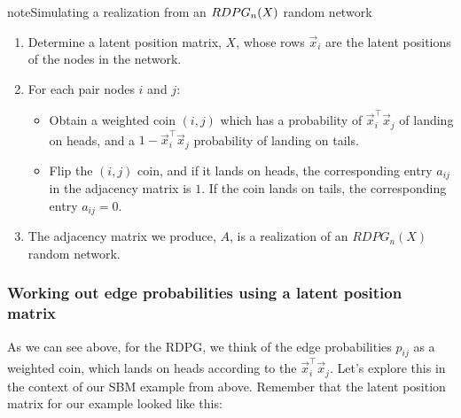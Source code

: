 \documentclass[letterpaper,10pt,english]{jupyterBook}
\begin{document}
\begin{sphinxadmonition}{note}{Simulating a realization from an \protect\(RDPG_n(X)\protect\) random network}
\begin{enumerate}
%
\item {} 
\sphinxAtStartPar
Determine a latent position matrix, \(X\), whose rows \(\vec x_i\) are the latent positions of the nodes in the network.

\item {} 
\sphinxAtStartPar
For each pair nodes \(i\) and \(j\):
\begin{itemize}
\item {} 
\sphinxAtStartPar
Obtain a weighted coin \((i,j)\) which has a probability of \(\vec x_i^\top \vec x_j\) of landing on heads, and a \(1 - \vec x_i^\top \vec x_j\) probability of landing on tails.

\item {} 
\sphinxAtStartPar
Flip the \((i,j)\) coin, and if it lands on heads, the corresponding entry \(a_{ij}\) in the adjacency matrix is \(1\). If the coin lands on tails, the corresponding entry \(a_{ij} = 0\).

\end{itemize}

\item {} 
\sphinxAtStartPar
The adjacency matrix we produce, \(A\), is a realization of an \(RDPG_n(X)\) random network.

\end{enumerate}
\end{sphinxadmonition}


\subsubsection{Working out edge probabilities using a latent position matrix}
\label{\detokenize{representations/ch5/single-network-models_RDPG:working-out-edge-probabilities-using-a-latent-position-matrix}}
\sphinxAtStartPar
As we can see above, for the RDPG, we think of the edge probabilities \(p_{ij}\) as a weighted coin, which lands on heads according to the  \(\vec x_i^\top \vec x_j\). Let’s explore this in the context of our SBM example from above. Remember that the latent position matrix for our example looked like this:

\noindent{}
\end{document}
